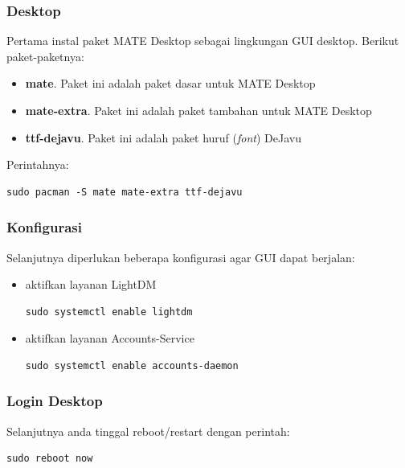 \documentclass[12pt,]{article}
\begin{document}
	\subsubsection{Desktop}
	Pertama instal paket MATE Desktop sebagai lingkungan GUI desktop.
	Berikut paket-paketnya:
	\begin{itemize}
		\item \textbf{mate}. Paket ini adalah paket dasar untuk MATE Desktop
		\item \textbf{mate-extra}. Paket ini adalah paket tambahan untuk MATE Desktop
		\item \textbf{ttf-dejavu}. Paket ini adalah paket huruf (\textit{font}) DeJavu
	\end{itemize}
	Perintahnya:
	\begin{verbatim}
sudo pacman -S mate mate-extra ttf-dejavu
	\end{verbatim}
	
	\subsubsection{Konfigurasi}
	Selanjutnya diperlukan beberapa konfigurasi agar GUI dapat berjalan:
	\begin{itemize}
		\item aktifkan layanan LightDM
		\begin{verbatim}
sudo systemctl enable lightdm
		\end{verbatim}
		
		\item aktifkan layanan Accounts-Service
		\begin{verbatim}
sudo systemctl enable accounts-daemon
		\end{verbatim}
	\end{itemize}

	\subsubsection{Login Desktop}
	Selanjutnya anda tinggal reboot/restart dengan perintah:
	\begin{verbatim}
sudo reboot now
	\end{verbatim}	
	
\end{document}
